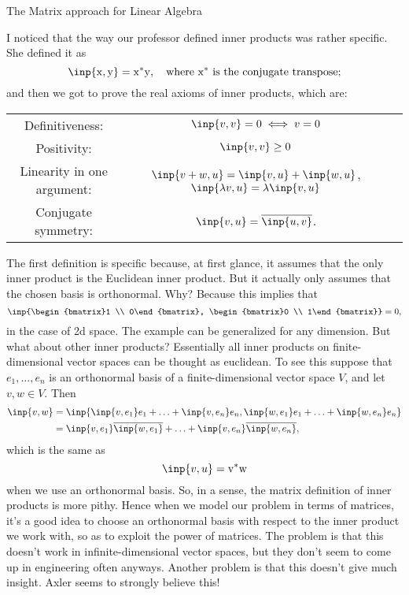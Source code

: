 \begin{entry}[2]{The Matrix approach for Linear Algebra}
\begin{entrysection}
I noticed that the way our professor defined inner products was rather specific. She defined it as
\[ \inp{\mathrm{x},\mathrm{y}} = \mathrm{x}^{*}\mathrm{y},\quad \text{where $\mathrm{x}^{*}$ is the conjugate transpose;}\]
and then we got to prove the real axioms of inner products, which are:
\begin{center}
\begin{tabular}{ccc}
Definitiveness:& $\inp{v,v} = 0 \iff v = 0$\\[5pt]
Positivity:& $\inp{v,v} \geq 0$\\[5pt] 
Linearity in one argument:& $\inp{v+w,u} = \inp{v,u} + \inp{w,u}$, \; $\inp{\lambda v,u} = \lambda\inp{v,u}$\\[5pt]
Conjugate symmetry:& $\inp{v,u} = \overline{\inp{u,v}}$.
\end{tabular} 
\end{center}
The first definition is specific because, at first glance, it assumes that the only inner product is the Euclidean inner product. But it actually only assumes that the chosen basis is orthonormal. Why? Because this implies that
\[ \inp{\begin{bmatrix}1 \\ 0\end{bmatrix}, \begin{bmatrix}0 \\ 1\end{bmatrix}} = 0, \]
in the case of 2d space. The example can be generalized for any dimension. But what about other inner products? Essentially all inner products on finite-dimensional vector spaces can be thought as euclidean. To see this suppose that $e_1,\ldots,e_n$ is an orthonormal basis of a finite-dimensional vector space $V$, and let $v, w\in V$. Then
\begin{align*}
\inp{v,w} &= \inp{\inp{v,e_1}e_1 + \ldots + \inp{v,e_n}e_n, \inp{w,e_1}e_1 + \ldots + \inp{w,e_n}e_n}\\
&= \inp{v,e_1}\overline{\inp{w,e_1}} + \ldots + \inp{v,e_n} \overline{\inp{w,e_n}},
\end{align*}
which is the same as
\[ \inp{v, u} = \mathrm{v}^{*}\mathrm{w}  \]
when we use an orthonormal basis. So, in a sense, the matrix definition of inner products is more pithy. Hence when we model our problem in terms of matrices, it's a good idea to choose an orthonormal basis with respect to the inner product we work with, so as to exploit the power of matrices. The problem is that this doesn't work in infinite-dimensional vector spaces, but they don't seem to come up in engineering often anyways. Another problem is that this doesn't give much insight. Axler seems to strongly believe this! 
\end{entrysection}


\end{entry}
